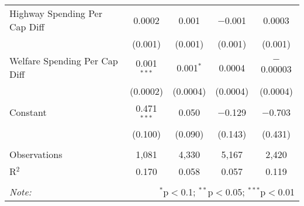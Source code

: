 \begin{table}[!htbp]
\begin{tabular}{@{\extracolsep{5pt}}lcccc}
  Highway Spending Per Cap Diff & 0.0002 & 0.001 & $-$0.001 & 0.0003 \\ 
  & (0.001) & (0.001) & (0.001) & (0.001) \\ 
  Welfare Spending Per Cap Diff & 0.001$^{***}$ & 0.001$^{*}$ & 0.0004 & $-$0.00003 \\ 
  & (0.0002) & (0.0004) & (0.0004) & (0.0004) \\ 
  Constant & 0.471$^{***}$ & 0.050 & $-$0.129 & $-$0.703 \\ 
  & (0.100) & (0.090) & (0.143) & (0.431) \\ 
 \hline \\[-1.8ex] 
Observations & 1,081 & 4,330 & 5,167 & 2,420 \\ 
R$^{2}$ & 0.170 & 0.058 & 0.057 & 0.119 \\ 
\hline 
\hline \\[-1.8ex] 
\textit{Note:}  & \multicolumn{4}{r}{$^{*}$p$<$0.1; $^{**}$p$<$0.05; $^{***}$p$<$0.01} \\ 
\end{tabular} 
\end{table} 
